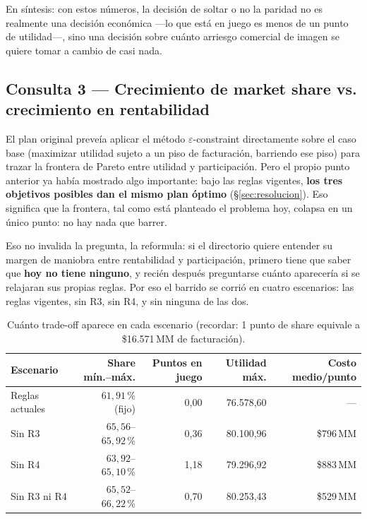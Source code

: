 \documentclass[10pt,a4paper]{article}
\begin{document}
En síntesis: con estos números, la decisión de soltar o no la paridad no es
realmente una decisión económica —lo que está en juego es menos de un punto de
utilidad—, sino una decisión sobre cuánto arriesgo comercial de imagen se
quiere tomar a cambio de casi nada.

\subsection{Consulta 3 — Crecimiento de market share vs. crecimiento en rentabilidad}
\label{sec:consulta3}

El plan original preveía aplicar el método $\varepsilon$-constraint
directamente sobre el caso base (maximizar utilidad sujeto a un piso de
facturación, barriendo ese piso) para trazar la frontera de Pareto entre
utilidad y participación. Pero el propio punto anterior ya había mostrado algo
importante: bajo las reglas vigentes, \textbf{los tres objetivos posibles dan
el mismo plan óptimo} (\S\ref{sec:resolucion}). Eso significa que la frontera,
tal como está planteado el problema hoy, colapsa en un único punto: no hay
nada que barrer.

Eso no invalida la pregunta, la reformula: si el directorio quiere entender su
margen de maniobra entre rentabilidad y participación, primero tiene que saber
que \textbf{hoy no tiene ninguno}, y recién después preguntarse cuánto
aparecería si se relajaran sus propias reglas. Por eso el barrido se corrió en
cuatro escenarios: las reglas vigentes, sin R3, sin R4, y sin ninguna de las
dos.

\begin{table}[htbp]
\centering\small
\caption{Cuánto trade-off aparece en cada escenario (recordar: 1 punto de
share equivale a \$16.571\,MM de facturación).}
\begin{tabular}{lrrrr}
\toprule
Escenario & Share mín.--máx. & Puntos en juego & Utilidad máx. & Costo medio/punto \\
\midrule
Reglas actuales   & $61{,}91\,\%$ (fijo)     & 0{,}00 & 76.578,60 & — \\
Sin R3            & $65{,}56$--$65{,}92\,\%$ & 0{,}36 & 80.100,96 & \$796\,MM \\
Sin R4            & $63{,}92$--$65{,}10\,\%$ & 1{,}18 & 79.296,92 & \$883\,MM \\
Sin R3 ni R4      & $65{,}52$--$66{,}22\,\%$ & 0{,}70 & 80.253,43 & \$529\,MM \\
\bottomrule
\end{tabular}
\end{table}
\end{document}
